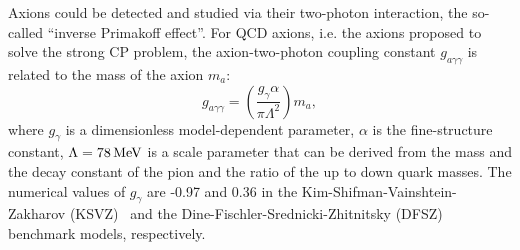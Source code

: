 \documentclass[%
reprint, %
superscriptaddress,
 amsmath,amssymb,
 aps
]{revtex4-2}
\begin{document}
Axions could be detected and studied via their two-photon interaction, the
so-called ``inverse Primakoff effect''. For QCD axions, i.e. the axions 
proposed to solve the strong CP problem, the axion-two-photon coupling 
constant $g_{a\gamma\gamma}$ is related to the mass of the axion $m_a$: 
\begin{equation}
 g_{a\gamma\gamma}= \left(\frac{g_{\gamma}\alpha}{\pi \Lambda^2}\right)m_a, 
\label{eq:grelation}
\end{equation}
where $g_{\gamma}$ is a dimensionless model-dependent parameter, $\alpha$ is 
the fine-structure constant, $\Lambda=78\,\text{Me\hspace{-.08em}V}$ is a 
scale parameter that can be derived from the mass and the decay constant of 
the pion and the ratio of the up to down quark masses. 
The numerical values of $g_{\gamma}$ are -0.97 and 0.36 
in the Kim-Shifman-Vainshtein-Zakharov (KSVZ)~\cite{KSVZI,KSVZII} and 
the Dine-Fischler-Srednicki-Zhitnitsky (DFSZ)~\cite{DFSZI,DFSZII} benchmark 
models, respectively. 
\end{document}
